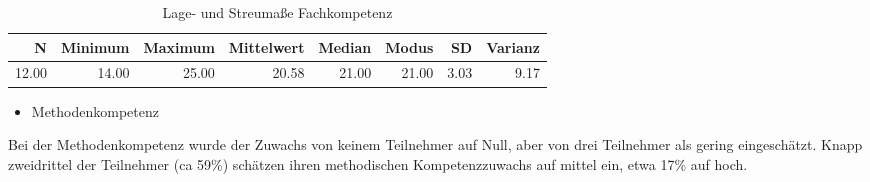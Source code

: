 \documentclass[12pt, bibliography=totoc]{scrartcl}
\begin{document}
\begin{table}[H]
\centering
\caption{Lage- und Streumaße Fachkompetenz}
\begin{tabular}{rrrrrrrr}
  \hline
  N & Minimum & Maximum & Mittelwert & Median & Modus & SD & Varianz \\
  \hline
 12.00 & 14.00 & 25.00 & 20.58 & 21.00 & 21.00 & 3.03 & 9.17 \\
   \hline
\end{tabular}
\end{table}

\begin{itemize}
\tightlist
\item
  Methodenkompetenz
\end{itemize}

Bei der Methodenkompetenz wurde der Zuwachs von keinem Teilnehmer auf
Null, aber von drei Teilnehmer als gering eingeschätzt. Knapp
zweidrittel der Teilnehmer (ca 59\%) schätzen ihren methodischen
Kompetenzzuwachs auf mittel ein, etwa 17\% auf hoch.
\end{document}
